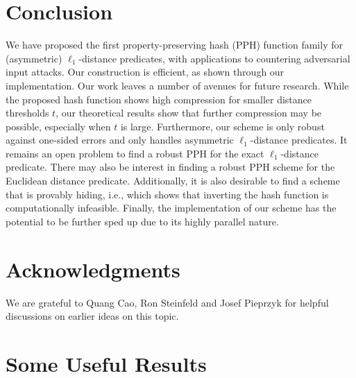 \documentclass[pdflatex,sn-mathphys-num]{sn-jnl}
\theoremstyle{definition}
\begin{document}

%
%
\section{Conclusion}
\label{sec:conclude}
We have proposed the first property-preserving hash (PPH) function family for (asymmetric) $\ell_1$-distance predicates, with applications to countering adversarial input attacks. Our construction is efficient, as shown through our implementation. Our work leaves a number of avenues for future research. While the proposed hash function shows high compression for smaller distance thresholds $t$, our theoretical results show that further compression may be possible, especially when $t$ is large. Furthermore, our scheme is only robust against one-sided errors and only handles asymmetric $\ell_1$-distance predicates. It remains an open problem to find a robust PPH for the exact $\ell_1$-distance predicate. There may also be interest in finding a robust PPH scheme for the Euclidean distance predicate. Additionally, it is also desirable to find a scheme that is provably hiding, i.e., which shows that inverting the hash function is computationally infeasible. Finally, the implementation of our scheme has the potential to be further sped up due to its highly parallel nature. 

\section*{Acknowledgments}
We are grateful to Quang Cao, Ron Steinfeld and Josef Pieprzyk for helpful discussions on earlier ideas on this topic.

\appendix
\section{Some Useful Results}
\label{app:useful}
\end{document}
